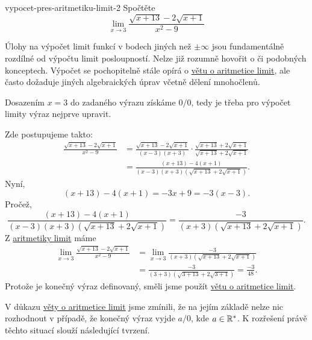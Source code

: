 \begin{problem}{}{vypocet-pres-aritmetiku-limit-2}
 Spočtěte
 \[
  \lim_{x \to 3} \frac{\sqrt{x+13} - 2 \sqrt{x+1}}{x^2 - 9}
 \]
\end{problem}
\begin{probsol}
 Úlohy na výpočet limit funkcí v bodech jiných než $ \pm \infty$ jsou
 fundamentálně rozdílné od výpočtu limit posloupností. Nelze již rozumně hovořit
 o  či podobných konceptech. Výpočet se
 pochopitelně stále opírá o \hyperref[thm:aritmetika-limit-funkci]{větu o
 aritmetice limit}, ale často dožaduje jiných algebraických úprav včetně dělení
 mnohočlenů.

 Dosazením $x = 3$ do zadaného výrazu získáme $0 / 0$, tedy je třeba pro výpočet
 limity výraz nejprve upravit.

 Zde postupujeme takto:
 \begin{align*}
  \frac{\sqrt{x + 13} - 2 \sqrt{x+1}}{x^2 - 9} &= \frac{\sqrt{x+13} - 2
  \sqrt{x+1}}{(x-3)(x+3)} \cdot \frac{\sqrt{x+13} + 2 \sqrt{x+1}}{\sqrt{x + 13}
 	+ 2 \sqrt{x+1}}\\
 																							 &= \frac{(x+13) -
 																							 4(x+1)}{(x-3)(x+3)(\sqrt{x+13} +
 																							 2 \sqrt{x+1})}.
 \end{align*}
 Nyní,
 \[
  (x + 13) - 4(x + 1) = -3x + 9 = -3(x-3).
 \]
 Pročež,
 \[
 	\frac{(x + 13) - 4(x + 1)}{(x-3)(x+3)(\sqrt{x+13} + 2 \sqrt{x+1})} =
 	\frac{-3}{(x+3)(\sqrt{x+13} + 2 \sqrt{x+1})}.
 \]
 Z \hyperref[thm:aritmetika-limit-funkci]{aritmetiky limit} máme
 \begin{align*}
  \lim_{x \to 3} \frac{\sqrt{x+13} - 2 \sqrt{x+1}}{x^2 - 9} &= \lim_{x \to 3}
  \frac{-3}{(x+3)(\sqrt{x+13} + 2 \sqrt{x+1})}\\
  																													&= \frac{-3}{(3 +
  																													3)(\sqrt{3 + 13} + 2
  																												 \sqrt{3 + 1})} =
  																												 \frac{-3}{48}.
 \end{align*}
 Protože je konečný výraz definovaný, směli jsme použít
 \hyperref[thm:aritmetika-limit-funkci]{větu o aritmetice limit}.
\end{probsol}

V důkazu \hyperref[thm:aritmetika-limit-funkci]{věty o aritmetice limit} jsme
zmínili, že na jejím základě nelze nic rozhodnout v případě, že konečný výraz
vyjde $a / 0$, kde $a \in \mathbb{R}^{*}$. K rozřešení právě těchto situací slouží
následující tvrzení.

